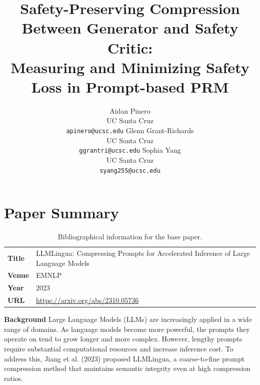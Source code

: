 \documentclass[11pt]{article}
\title{Safety-Preserving Compression Between Generator and Safety Critic: \\ Measuring and Minimizing Safety Loss in Prompt-based PRM}
\author{
  Aidan Pinero \\
  UC Santa Cruz \\
  \texttt{apinero@ucsc.edu} \And
  Glenn Grant-Richards \\
  UC Santa Cruz \\
  \texttt{ggrantri@ucsc.edu} \And
  Sophia Yang \\
  UC Santa Cruz \\
  \texttt{syang255@ucsc.edu} 
}
\date{}
\newcommand{\todo}[1]{\textcolor{orange}{[TODO: #1]}}
\begin{document}
\maketitle

\section{Paper Summary}

\begin{table}[h]
    \centering
    \small
    \begin{tabular}{lp{6cm}}
        \toprule
        \textbf{Title} & LLMLingua: Compressing Prompts for Accelerated Inference of Large Language Models \\
        \textbf{Venue} & EMNLP \\
        \textbf{Year}  & 2023 \\
        \textbf{URL}   & \href{https://arxiv.org/abs/2310.05736}{https://arxiv.org/abs/2310.05736} \\ 
        \bottomrule
    \end{tabular}
    \caption{Bibliographical information for the base paper.}
\end{table}

\noindent\textbf{Background} Large Language Models (LLMs) are increasingly applied in a wide range of domains. As language models become more powerful, the prompts they operate on tend to grow longer and more complex. However, lengthy prompts require substantial computational resources and increase inference cost. To address this, Jiang et al. (2023) proposed LLMLingua, a coarse-to-fine prompt compression method that maintains semantic integrity even at high compression ratios.





\end{document}

